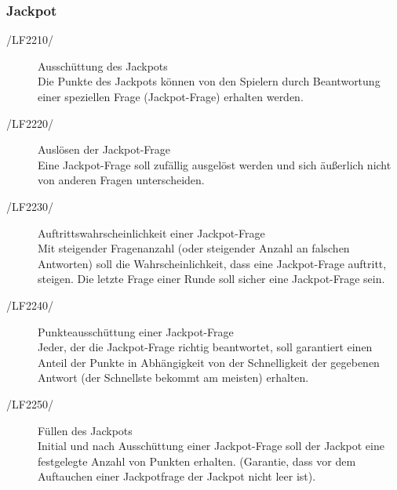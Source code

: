 \documentclass[11pt,a4paper]{scrreprt}
\begin{document}
\subsubsection{Jackpot}
\begin{description}
\item[/LF2210/] Ausschüttung des Jackpots \\
Die Punkte des Jackpots können von den Spielern durch Beantwortung einer speziellen Frage (Jackpot-Frage) erhalten werden.

\item[/LF2220/]Auslösen der Jackpot-Frage \\
Eine Jackpot-Frage soll zufällig ausgelöst werden und sich äußerlich nicht von anderen Fragen unterscheiden.

\item[/LF2230/] Auftrittswahrscheinlichkeit einer Jackpot-Frage \\
Mit steigender Fragenanzahl (oder steigender Anzahl an falschen Antworten) soll die Wahrscheinlichkeit, dass eine Jackpot-Frage auftritt, steigen. Die letzte Frage einer Runde soll sicher eine Jackpot-Frage sein.

\item[/LF2240/] Punkteausschüttung einer Jackpot-Frage \\
Jeder, der die Jackpot-Frage richtig beantwortet, soll garantiert einen Anteil der Punkte in Abhängigkeit von der Schnelligkeit der gegebenen Antwort (der Schnellste bekommt am meisten) erhalten.

\item[/LF2250/] Füllen des Jackpots \\
Initial und nach Ausschüttung einer Jackpot-Frage soll der Jackpot eine festgelegte Anzahl von Punkten erhalten. (Garantie, dass vor dem Auftauchen einer Jackpotfrage der Jackpot nicht leer ist).

\end{description}
\end{document}
